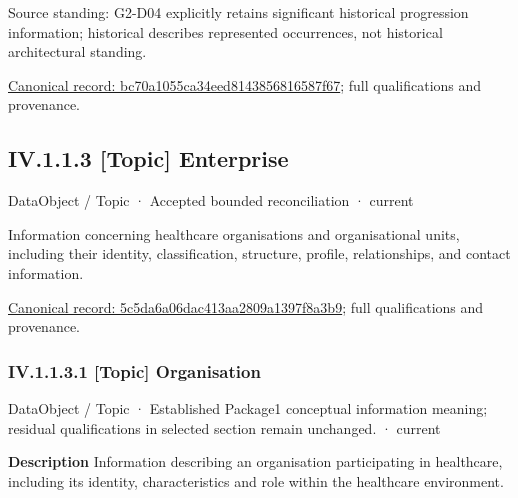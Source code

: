 Source standing: G2-D04 explicitly retains significant historical progression information; historical describes represented occurrences, not historical architectural standing.


{\footnotesize \href{../../../../../../../../continuum/application/data-object/topic/bc70a1055ca34eed8143856816587f67.md}{Canonical record: bc70a1055ca34eed8143856816587f67}; full qualifications and provenance.}\par
\subsection*{IV.1.1.3 [Topic] Enterprise}
\label{navigation:IV.1.1.3}

\label{element:5c5da6a06dac413aa2809a1397f8a3b9}
{\small DataObject / Topic · Accepted bounded reconciliation · current}\par

Information concerning healthcare organisations and organisational units, including their identity, classification, structure, profile, relationships, and contact information.


{\footnotesize \href{../../../../../../../../continuum/application/data-object/topic/5c5da6a06dac413aa2809a1397f8a3b9.md}{Canonical record: 5c5da6a06dac413aa2809a1397f8a3b9}; full qualifications and provenance.}\par
\subsubsection*{IV.1.1.3.1 [Topic] Organisation}
\label{navigation:IV.1.1.3.1}

\label{element:dd3ba70128874caeb2d5da419d006c49}
{\small DataObject / Topic · Established Package1 conceptual information meaning; residual qualifications in selected section remain unchanged. · current}\par

\textbf{Description}
Information describing an organisation participating in healthcare, including its identity, characteristics and role within the healthcare environment.




